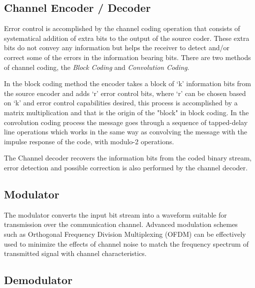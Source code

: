 
\subsection{Channel Encoder / Decoder}

Error control is accomplished by the channel coding operation that consists of
systematical addition of extra bits to the output of the source coder. These
extra bits do not convey any information but helps the receiver to detect and/or
correct some of the errors in the information bearing bits. There are two
methods of channel coding, the \textit{Block Coding} and \textit{Convolution
Coding}.

In the block coding method the encoder takes a block of ‘k’ information bits
from the source encoder and adds ‘r’ error control bits, where ‘r’ can be chosen
based on ‘k’ and error control capabilities desired, this process is
accomplished by a matrix multiplication and that is the origin of the "block" in
block coding. In the convolution coding process the message goes through a
sequence of tapped-delay line operations which works in the same way as
convolving the message with the impulse response of the code, with modulo-2
operations.

The Channel decoder recovers the information bits from the coded binary stream,
error detection and possible correction is also performed by the channel
decoder.

\subsection{Modulator}

The modulator converts the input bit stream into a waveform suitable for
transmission over the communication channel. Advanced modulation schemes such as
Orthogonal Frequency Division Multiplexing (OFDM) can be effectively used to
minimize the effects of channel noise to match the frequency spectrum of
transmitted signal with channel characteristics.

\subsection{Demodulator}

